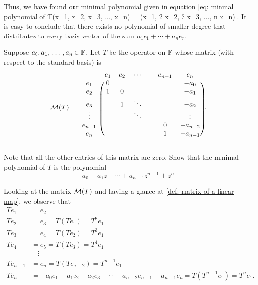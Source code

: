 \begin{xrcs}
\begin{xsol}
    Thus, we have found our minimal polynomial given in equation \eqref{eq: minmal polynomial of T(x_1, x_2, x_3, ..., x_n) = (x_1, 2 x_2, 3 x_3, ...,  n x_n)}. It is easy to conclude that there exists no polynomial of smaller degree that distributes to every basis vector of the sum $a_1 e_1 + \cdots + a_n e_n$.
  \end{xsol}
\end{xrcs}

\begin{xrcs}
  Suppose $a_0, a_1, {\, \ldots \,\,}, a_n \in \mathbb{F}$. Let $T$ be the operator on $\mathbb{F}$ whose matrix (with respect to the standard basis) is
  \begin{equation}
    \mmatrix (T) =
    \begin{blockarray}{cccccccc}
               & e_1 & e_2 & \cdots & & e_{n-1} & e_n      \\
      \begin{block}{c(ccccccc)}
        e_1    & 0   &     &        & &         & -a_0     \\
        e_2    & 1   & 0   &        & &         & -a_1     \\
        e_3    &     & 1   & \ddots & &         & -a_2     \\
        \vdots &     &     & \ddots & &         &  \vdots  \\
        e_{n-1}&     &     &        & & 0       & -a_{n-2} \\
        e_n    &     &     &        & & 1       & -a_{n-1} \\
      \end{block}
    \end{blockarray}.
  \end{equation}

  Note that all the other entries of this matrix are zero. Show that the minimal polynomial of $T$ is the polynomial
  \begin{equation}
    a_0 + a_1 z + \cdots + a_{n-1} z^{n-1} + z^n
  \end{equation}

  \begin{xsol}
    Looking at the matrix $\mathcal{M}(T)$ and having a glance at \ref{def: matrix of a linear map}, we observe that
    \begin{equation}
      \begin{aligned}
        T e_1 &= e_2 \\
        T e_2 &= e_3 = T(Te_1) = T^2 e_1 \\
        T e_3 &= e_4 = T(Te_2) = T^3 e_1 \\
        T e_4 &= e_5 = T(Te_3) = T^4 e_1 \\
              & \quad \vdots \\
        T e_{n-1} &= e_n = T(Te_{n-2}) = T^{n-1}e_1 \\
        T e_n &= -a_0 e_1  -a_1 e_2 - a_2 e_3 - \cdots - a_{n-2} e_{n-1} - a_{n-1} e_n
               = T (T^{n-1} e_1) = T^n e_1.
      \end{aligned}
    \end{equation}


\end{xsol}
\end{xrcs}
